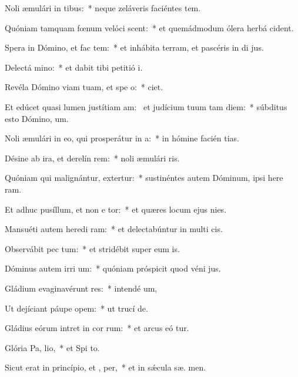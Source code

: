 \item Noli æmulári in tibus:~* neque zeláveris faciéntes tem.
\item Quóniam tamquam fœnum velóci scent:~* et quemádmodum ólera herbá  cident.
\item Spera in Dómino, et fac tem:~* et inhábita terram, et pascéris in di jus.
\item Delectá  mino:~* et dabit tibi petitió  i.
\item Revéla Dómino viam tuam, et spe  o:~*   ciet.
\item Et edúcet quasi lumen justítiam am:~\pscross{} et judícium tuum tam diem:~* súbditus esto Dómino,   um.
\item Noli æmulári in eo, qui prosperátur in  a:~* in hómine facién tias.
\item Désine ab ira, et derelín rem:~* noli æmulári  ris.
\item Quóniam qui malignántur, extertur:~* sustinéntes autem Dóminum, ipsi here ram.
\item Et adhuc pusíllum, et non e tor:~* et quæres locum ejus   nies.
\item Mansuéti autem heredi ram:~* et delectabúntur in multi cis.
\item Observábit pec tum:~* et stridébit super eum  is.
\item Dóminus autem irri um:~* quóniam próspicit quod véni  jus.
\item Gládium evaginavérunt res:~* intendé  um,
\item Ut dejíciant páupe  opem:~* ut trucí  de.
\item Gládius eórum intret in cor rum:~* et arcus eó tur.
\item Glória Pa,  lio,~* et Spi to.
\item Sicut erat in princípio, et ,  per,~* et in sǽcula sæ. men.
